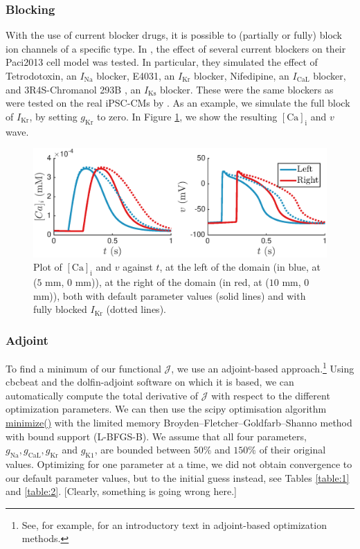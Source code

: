 \documentclass{article}
\begin{document}
\subsubsection{Blocking} \label{Blocking}
With the use of current blocker drugs, it is possible to (partially or fully) block ion channels of a specific type. In \cite{Paci2013}, the effect of several current blockers on their Paci2013 cell model was tested. In particular, they simulated the effect of Tetrodotoxin, an $I_{\mathrm{Na}}$ blocker, E4031, an $I_{\mathrm{Kr}}$ blocker, Nifedipine, an $I_{\mathrm{CaL}}$ blocker, and 3R4S-Chromanol 293B , an $I_{\mathrm{Ks}}$ blocker. These were the same blockers as were tested on the real iPSC-CMs by \cite{Ma2011}. As an example, we simulate the full block of $I_{\mathrm{Kr}}$, by setting $g_{\mathrm{Kr}}$ to zero. In Figure \ref{fig:blocking}, we show the resulting $[\mathrm{Ca}]_{\mathrm{i}}$ and $v$ wave. 
%
\begin{figure}
   \includegraphics[width=1\linewidth]{blocking} 
    \caption{Plot of $[\mathrm{Ca}]_{\mathrm{i}}$ and $v$ against $t$, at the left of the domain (in blue, at ($5$ mm, $0$ mm)), at the right of the domain (in red, at ($10$ mm, $0$ mm)), both with default parameter values (solid lines) and with fully blocked $I_{\mathrm{Kr}}$ (dotted lines).}
    \label{fig:blocking}
\end{figure}
%
\subsubsection{Adjoint} \label{Adjoint}
To find a minimum of our functional $\mathcal{J}$, we use an adjoint-based approach.\footnote{See, for example, \cite{Gunzburger} for an introductory text in adjoint-based optimization methods.} Using cbcbeat and the dolfin-adjoint software on which it is based, we can automatically compute the total derivative of $\mathcal{J}$ with respect to the different optimization parameters. We can then use the scipy optimisation algorithm \url{minimize()} with the limited memory Broyden–Fletcher–Goldfarb–Shanno method with bound support (L-BFGS-B). We assume that all four parameters, $g_{\mathrm{Na}}, g_{\mathrm{CaL}}, g_{\mathrm{Kr}}$ and $g_{\mathrm{K1}}$, are bounded between $50\%$ and $150\%$ of their original values.
 Optimizing for one parameter at a time, we did not obtain convergence to our default parameter values, but to the initial guess instead, see Tables \ref{table:1} and \ref{table:2}. [Clearly, something is going wrong here.]
\end{document}
